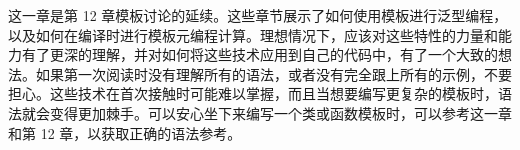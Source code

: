 这一章是第 12 章模板讨论的延续。这些章节展示了如何使用模板进行泛型编程，以及如何在编译时进行模板元编程计算。理想情况下，应该对这些特性的力量和能力有了更深的理解，并对如何将这些技术应用到自己的代码中，有了一个大致的想法。如果第一次阅读时没有理解所有的语法，或者没有完全跟上所有的示例，不要担心。这些技术在首次接触时可能难以掌握，而且当想要编写更复杂的模板时，语法就会变得更加棘手。可以安心坐下来编写一个类或函数模板时，可以参考这一章和第 12 章，以获取正确的语法参考。
